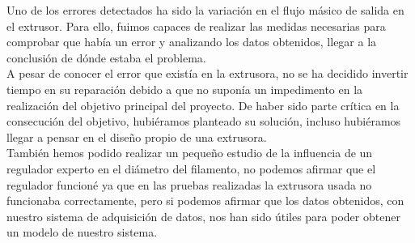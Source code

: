 Uno de los errores detectados ha sido la variación en el flujo másico de salida en el extrusor. Para ello, fuimos capaces de realizar las medidas necesarias para comprobar que había un error y analizando los datos obtenidos, llegar a la conclusión de dónde estaba el problema.\\

A pesar de conocer el error que existía en la extrusora, no se ha decidido invertir tiempo en su reparación debido a que no suponía un impedimento en la realización del objetivo principal del proyecto. De haber sido parte crítica en la consecución del objetivo, hubiéramos planteado su solución, incluso hubiéramos llegar a pensar en el diseño propio de una extrusora.\\

También hemos podido realizar un pequeño estudio de la influencia de un regulador experto en el diámetro del filamento, no podemos afirmar que el regulador funcioné ya que en las pruebas realizadas la extrusora usada no funcionaba correctamente, pero si podemos afirmar que los datos obtenidos, con nuestro sistema de adquisición de datos, nos han sido útiles para poder obtener un modelo de nuestro sistema.